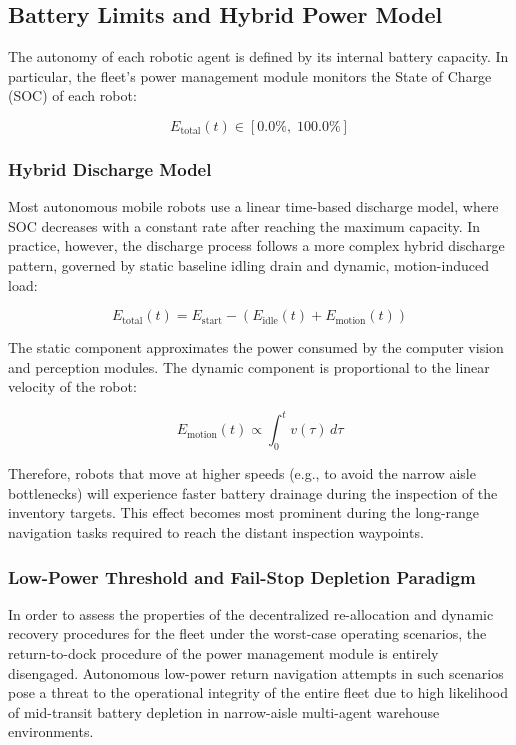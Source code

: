 \subsection{Battery Limits and Hybrid Power Model}

The autonomy of each robotic agent is defined by its internal battery capacity. In particular, the fleet's power management module monitors the State of Charge (SOC) of each robot:

\begin{equation}
E_{\text{total}}(t) \in [0.0\%, \; 100.0\%]
\end{equation}

\subsubsection{Hybrid Discharge Model}

Most autonomous mobile robots use a linear time-based discharge model, where SOC decreases with a constant rate after reaching the maximum capacity. In practice, however, the discharge process follows a more complex hybrid discharge pattern, governed by static baseline idling drain and dynamic, motion-induced load\cite{liu2023open}:

\begin{equation}
E_{\text{total}}(t) = E_{\text{start}} - \left( E_{\text{idle}}(t) + E_{\text{motion}}(t) \right)
\end{equation}

The static component approximates the power consumed by the computer vision and perception modules. The dynamic component is proportional to the linear velocity of the robot:

\begin{equation}
E_{\text{motion}}(t) \propto \int_{0}^{t} v(\tau) \, d\tau
\end{equation}

Therefore, robots that move at higher speeds (e.g., to avoid the narrow aisle bottlenecks) will experience faster battery drainage during the inspection of the inventory targets. This effect becomes most prominent during the long-range navigation tasks required to reach the distant inspection waypoints.

\subsubsection{Low-Power Threshold and Fail-Stop Depletion Paradigm}

In order to assess the properties of the decentralized re-allocation and dynamic recovery procedures for the fleet under the worst-case operating scenarios, the return-to-dock procedure of the power management module is entirely disengaged. Autonomous low-power return navigation attempts in such scenarios pose a threat to the operational integrity of the entire fleet due to high likelihood of mid-transit battery depletion in narrow-aisle multi-agent warehouse environments.

